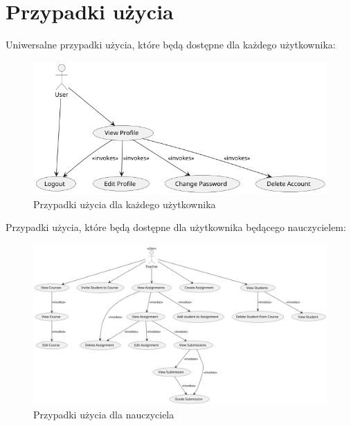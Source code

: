 \section{Przypadki użycia}\label{przygotowania:przypadki-uzycia}
Uniwersalne przypadki użycia, które będą dostępne dla każdego użytkownika:
\begin{figure}[H]
    \centering
    \clearpage
    \includegraphics[width=15cm,keepaspectratio]{rysunki/usecases/UserUseCases.png}
    \caption{Przypadki użycia dla każdego użytkownika}
    \label{fig:usecases:user}
\end{figure}

Przypadki użycia, które będą dostępne dla użytkownika będącego nauczycielem:
\begin{figure}[H]
    \centering
    \clearpage
    \includegraphics[width=15cm,keepaspectratio]{rysunki/usecases/TeacherUseCases.png}
    \caption{Przypadki użycia dla nauczyciela}
    \label{fig:usecases:teacher}
\end{figure}

